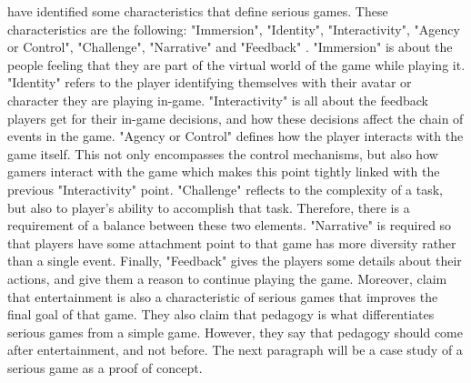 \documentclass{l4proj}
\begin{document}
\citet{blumberg_serious_2012} have identified some characteristics that define serious games. These characteristics are the following: "Immersion", "Identity",
"Interactivity", "Agency or Control", "Challenge", "Narrative" and "Feedback" \citep{blumberg_serious_2012}.
"Immersion" is about the people feeling that they are part of the virtual world of the game while playing it. 
"Identity" refers to the player identifying themselves with their avatar or character they are playing in-game.
"Interactivity" is all about the feedback players get for their in-game decisions, and how these decisions affect the chain of events in the game.
"Agency or Control" defines how the player interacts with the game itself. This not only encompasses the control mechanisms, 
but also how gamers interact with the game which makes this point tightly linked with the previous "Interactivity" point.
"Challenge" reflects to the complexity of a task, but also to player's ability to accomplish that task. Therefore, there is a requirement of a balance between these two elements.
"Narrative" is required so that players have some attachment point to that game has more diversity rather than a single event.
Finally, "Feedback" gives the players some details about their actions, and give them a reason to continue playing the game.
Moreover, \citet{susi_serious_2007} claim that entertainment is also a characteristic of serious games that improves the final goal of that game.
They also claim that pedagogy is what differentiates serious games from a simple game. However, they say that pedagogy should come after entertainment, and not before.
The next paragraph will be a case study of a serious game as a proof of concept.
\end{document}
